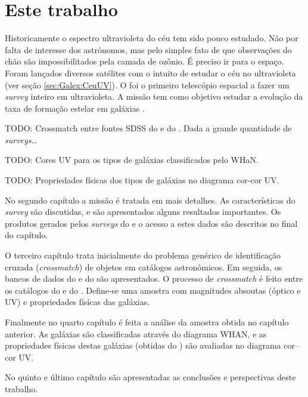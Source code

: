 
\section{Este trabalho}
\label{sec:Intro:EsteTrab}

Historicamente o espectro ultravioleta do céu tem sido pouco estudado. Não por
falta de interesse dos astrônomos, mas pelo simples fato de que observações do
chão são impossibilitados pela camada de ozônio. É preciso ir para o espaço.
Foram lançados diversos satélites com o intuito de estudar o céu no ultravioleta
(ver seção \ref{sec:Galex:CeuUV}). O \galex foi o primeiro telescópio espacial a
fazer um {\em survey} inteiro em ultravioleta. A missão tem como objetivo
estudar a evolução da taxa de formação estelar em galáxias \citep{Martin2005}.

TODO: Crossmatch entre fontes SDSS do \starlight e do \galex.
Dada a grande quantidade de {\em surveys}\ldots

TODO: Cores UV para os tipos de galáxias classificados pelo WHaN.

TODO: Propriedades físicas dos tipos de galáxias no diagrama cor-cor UV.

No segundo capítulo a missão \galex é tratada em mais detalhes. As
características do {\em survey} são discutidas, e são apresentados alguns
resultados importantes. Os produtos gerados pelos {\em surveys} do \galex
e o acesso a estes dados são descritos no final do capítulo.

O terceiro capítulo trata inicialmente do problema genérico de identificação
cruzada ({\em crossmatch}) de objetos em catálogos astronômicos. Em seguida, os
bancos de dados do \SDSS e do \starlight são apresentados. O processo de
{\em crossmatch} é feito entre os catálogos do \SDSS e do \galex. Define-se uma
amostra com magnitudes absoutas (óptico e UV) e propriedades físícas das
galáxias.

Finalmente no quarto capítulo é feita a análise da amostra obtida no capítulo
anterior. As galáxias são classificadas através do diagrama WHAN, e as
propriedades físicas destas galáxias (obtidas do \starlight) são avaliadas no
diagrama cor--cor UV.

No quinto e último capítulo são apresentadas as conclusões e perspectivas deste
trabalho.

